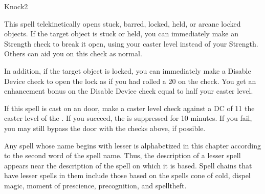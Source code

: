 \begin{spellsection}{Knock}{2}
\begin{spellheader}
\end{spellheader}
\begin{spellcontent}
    \begin{spelltargetinginfo}
    \end{spelltargetinginfo}
    \begin{spelleffects}
        \spelleffect This spell telekinetically opens stuck, barred, locked, held, or arcane locked objects. If the target object is stuck or held, you can immediately make an Strength check to break it open, using your caster level instead of your Strength. Others can aid you on this check as normal.
        
        In addition, if the target object is locked, you can immediately make a Disable Device check to open the lock as if you had rolled a 20 on the check. You get an enhancement bonus on the Disable Device check equal to half your caster level.
    \end{spelleffects}
\end{spellcontent}
\begin{spellfooter}
    \spellnotes If this spell is cast on an  door, make a caster level check against a DC of 11 \add the caster level of the . If you succeed, the  is suppressed for 10 minutes. If you fail, you may still bypass the door with the checks above, if possible.
\end{spellfooter}

\par Any spell whose name begins with lesser is alphabetized in this chapter according to the second word of the spell name. Thus, the description of a lesser spell appears near the description of the spell on which it is based. Spell chains that have lesser spells in them include those based on the spells cone of cold, dispel magic, moment of prescience, precognition, and spelltheft.
\end{spellsection}

